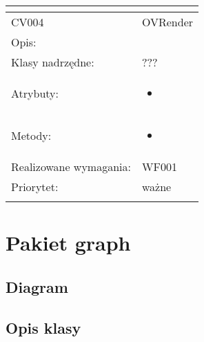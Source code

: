 \documentclass[a4paper,10pt]{article}
\begin{document}
\begin{center}
\begin{longtable}{|m{3cm}|m{9cm}|}
\multicolumn{2}{c}{} \\
 \hline

CV004 & OVRender \\ \hline
Opis: &     \\ \hline
Klasy nadrzędne: &  ???   \\ \hline
Atrybuty: & \begin{itemize}
 \item 
\end{itemize}
 \\ \hline
Metody: & \begin{itemize}
 \item 
\end{itemize}
  \\ \hline
Realizowane wymagania: & WF001 \\ \hline
Priorytet: & ważne  \\ \hline

\multicolumn{2}{c}{} \\
 \hline


\end{longtable}

\end{center}

\section{Pakiet graph}

\subsection{Diagram}

\subsection{Opis klasy}
\end{document}
